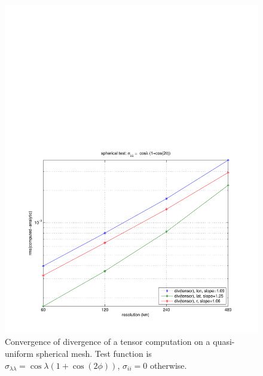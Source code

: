 \documentclass[11pt]{report}
\begin{document}
\begin{figure}[htbp]
 \center
 \includegraphics[scale=0.8, trim = 0 0 0 4in, clip]{f/a19_sph_conv_test_3.pdf}
 \caption{Convergence of divergence of a tensor computation on a quasi-uniform spherical mesh.  Test function is $\sigma_{\lambda\lambda}=\cos \lambda (1+\cos(2\phi))$, $\sigma_{ii}=0$ otherwise.}
 \label{fig:convergence3}
\end{figure}
\end{document}
